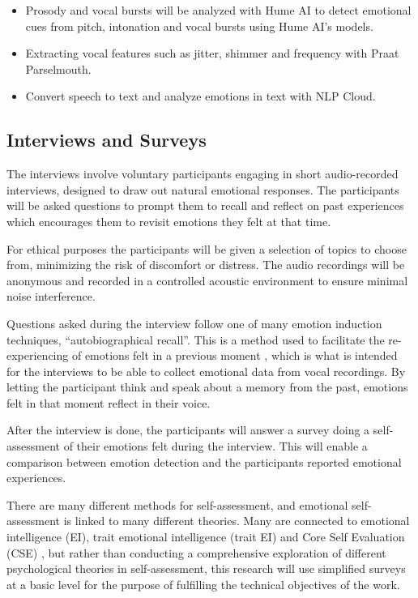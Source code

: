 \begin{itemize}
    \item Prosody and vocal bursts will be analyzed with Hume AI to detect emotional cues from pitch, intonation and vocal bursts using Hume AI’s models.
    \item Extracting vocal features such as jitter, shimmer and frequency with Praat Parselmouth.
    \item Convert speech to text and analyze emotions in text with NLP Cloud.
\end{itemize}


\subsection{Interviews and Surveys}
\label{sec:theo-interviews}

The interviews involve voluntary participants engaging in short audio-recorded interviews, designed to draw out natural emotional responses. The participants will be asked questions to prompt them to recall and reflect on past experiences which encourages them to revisit emotions they felt at that time. 

For ethical purposes the participants will be given a selection of topics to choose from, minimizing the risk of discomfort or distress. The audio recordings will be anonymous and recorded in a controlled acoustic environment to ensure minimal noise interference.

Questions asked during the interview follow one of many emotion induction techniques, “autobiographical recall”. This is a method used to facilitate the re-experiencing of emotions felt in a previous moment \autocite{Siedlecka2019}, which is what is intended for the interviews to be able to collect emotional data from vocal recordings. By letting the participant think and speak about a memory from the past, emotions felt in that moment reflect in their voice.

 After the interview is done, the participants will answer a survey doing a self-assessment of their emotions felt during the interview. This will enable a comparison between emotion detection and the participants reported emotional experiences.

There are many different methods for self-assessment, and emotional self-assessment is linked to many different theories. Many are connected to emotional intelligence (EI), trait emotional intelligence (trait EI) and Core Self Evaluation (CSE) \autocite{Montasem2013}, but rather than conducting a comprehensive exploration of different psychological theories in self-assessment, this research will use simplified surveys at a basic level for the purpose of fulfilling the technical objectives of the work. 

